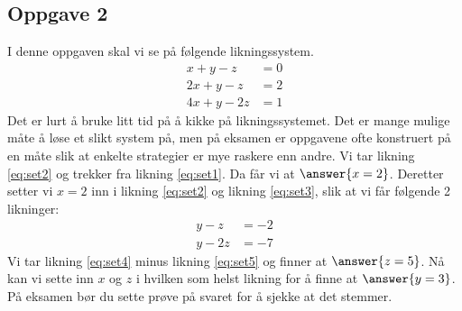 \subsection*{Oppgave 2}
I denne oppgaven skal vi se på følgende likningssystem.
\begin{align}
	\label{eq:set1} x + y -z &= 0 \\
	\label{eq:set2} 2x + y -z &= 2 \\
	\label{eq:set3} 4x + y -2z &= 1 
\end{align}
Det er lurt å bruke litt tid på å kikke på likningssystemet. Det er mange mulige måte å løse 
et slikt system på, men på eksamen er oppgavene ofte konstruert på en måte slik at enkelte
strategier er mye raskere enn andre.
Vi tar likning \eqref{eq:set2} og trekker fra likning \eqref{eq:set1}. Da får vi at $\answer{x = 2}$.
Deretter setter vi $x = 2$ inn i likning \eqref{eq:set2} og likning \eqref{eq:set3}, slik at vi får følgende 2 likninger:
\begin{align}
\label{eq:set4}  y -z &= -2 \\
\label{eq:set5} y -2z &= -7
\end{align}
Vi tar likning \eqref{eq:set4} minus likning \eqref{eq:set5} og finner at $\answer{z = 5}$. 
Nå kan vi sette inn $x$ og $z$ i hvilken som helst likning for å finne at $\answer{y = 3}$.
På eksamen bør du sette prøve på svaret for å sjekke at det stemmer.


